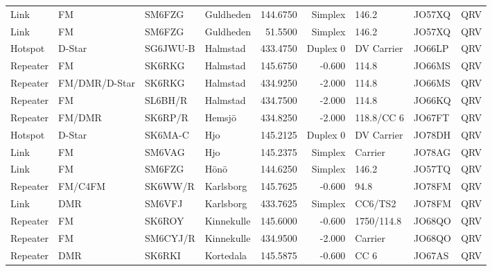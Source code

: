 \begin{landscape}
\begin{longtable}{llllrrlll}
	Link     & FM              & SM6FZG   & Guldheden             &     144.6750 &    Simplex & 146.2             & JO57XQ      & QRV      \\
	Link     & FM              & SM6FZG   & Guldheden             &      51.5500 &    Simplex & 146.2             & JO57XQ      & QRV      \\
	Hotspot  & D-Star          & SG6JWU-B & Halmstad              &     433.4750 &   Duplex 0 & DV Carrier        & JO66LP      & QRV      \\
	Repeater & FM              & SK6RKG   & Halmstad              &     145.6750 &     -0.600 & 114.8             & JO66MS      & QRV      \\
	Repeater & FM/DMR/D-Star   & SK6RKG   & Halmstad              &     434.9250 &     -2.000 & 114.8             & JO66MS      & QRV      \\
	Repeater & FM              & SL6BH/R  & Halmstad              &     434.7500 &     -2.000 & 114.8             & JO66KQ      & QRV      \\
	Repeater & FM/DMR          & SK6RP/R  & Hemsjö                &     434.8250 &     -2.000 & 118.8/CC 6        & JO67FT      & QRV      \\
	Hotspot  & D-Star          & SK6MA-C  & Hjo                   &     145.2125 &   Duplex 0 & DV Carrier        & JO78DH      & QRV      \\
	Link     & FM              & SM6VAG   & Hjo                   &     145.2375 &    Simplex & Carrier           & JO78AG      & QRV      \\
	Link     & FM              & SM6FZG   & Hönö                  &     144.6250 &    Simplex & 146.2             & JO57TQ      & QRV      \\
	Repeater & FM/C4FM         & SK6WW/R  & Karlsborg             &     145.7625 &     -0.600 & 94.8              & JO78FM      & QRV      \\
	Link     & DMR             & SM6VFJ   & Karlsborg             &     433.7625 &    Simplex & CC6/TS2           & JO78FM      & QRV      \\
	Repeater & FM              & SK6ROY   & Kinnekulle            &     145.6000 &     -0.600 & 1750/114.8        & JO68QO      & QRV      \\
	Repeater & FM              & SM6CYJ/R & Kinnekulle            &     434.9500 &     -2.000 & Carrier           & JO68QO      & QRV      \\
	Repeater & DMR             & SK6RKI   & Kortedala             &     145.5875 &     -0.600 & CC 6              & JO67AS      & QRV      \\

\end{longtable}
\end{landscape}
